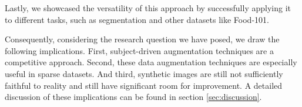 Lastly, we showcased the versatility of this approach by successfully applying it to different tasks, such as segmentation and other datasets like Food-101.

Consequently, considering the research question we have posed, we draw the following implications. First, subject-driven augmentation techniques are a competitive approach. Second, these data augmentation techniques are especially useful in sparse datasets. And third, synthetic images are still not sufficiently faithful to reality and still have significant room for improvement. A detailed discussion of these implications can be found in section \ref{sec:discussion}.